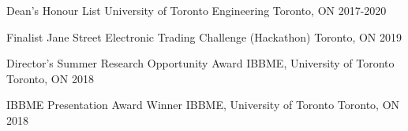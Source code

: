 
\begin{cvhonors}

  \cvhonor
    {Dean's Honour List} %
    {University of Toronto Engineering} %
    {Toronto, ON} %
    {2017-2020} %

  \cvhonor
    {Finalist} %
    {Jane Street Electronic Trading Challenge (Hackathon)} %
    {Toronto, ON} %
    {2019} %

  \cvhonor
    {Director’s Summer Research Opportunity Award} %
    {IBBME, University of Toronto} %
    {Toronto, ON} %
    {2018} %

  \cvhonor
    {IBBME Presentation Award Winner} %
    {IBBME, University of Toronto} %
    {Toronto, ON} %
    {2018} %

\end{cvhonors}
